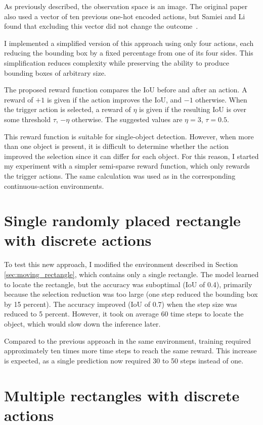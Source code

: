 \documentclass[
  digital,     %
  oneside,     %
  nosansbold,  %
  nocolorbold, %
  lof,         %
  lot,         %
]{fithesis4}
\begin{document}
As previously described, the observation space is an image. The original paper~\cite{iterative_od_with_rl} also used a vector of ten previous one-hot encoded actions, but Samiei and Li found that excluding this vector did not change the outcome~\cite{rl_object_detection}.

I implemented a simplified version of this approach using only four actions, each reducing the bounding box by a fixed percentage from one of its four sides. This simplification reduces complexity while preserving the ability to produce bounding boxes of arbitrary size.

The proposed reward function compares the IoU before and after an action. A reward of $+1$ is given if the action improves the IoU, and $-1$ otherwise. When the trigger action is selected, a reward of $\eta$ is given if the resulting IoU is over some threshold $\tau$, $-\eta$ otherwise. The suggested values are $\eta=3$, $\tau=0.5$.

This reward function is suitable for single-object detection. However, when more than one object is present, it is difficult to determine whether the action improved the selection since it can differ for each object. For this reason, I started my experiment with a simpler semi-sparse reward function, which only rewards the trigger actions. The same calculation was used as in the corresponding continuous-action environments.

\section{Single randomly placed rectangle with discrete actions}

To test this new approach, I modified the environment described in Section \ref{sec:moving_rectangle}, which contains only a single rectangle. The model learned to locate the rectangle, but the accuracy was suboptimal (IoU of 0.4), primarily because the selection reduction was too large (one step reduced the bounding box by 15 percent). The accuracy improved (IoU of 0.7) when the step size was reduced to 5 percent. However, it took on average 60 time steps to locate the object, which would slow down the inference later.

Compared to the previous approach in the same environment, training required approximately ten times more time steps to reach the same reward. This increase is expected, as a single prediction now required 30 to 50 steps instead of one.

\section{Multiple rectangles with discrete actions}
\end{document}
